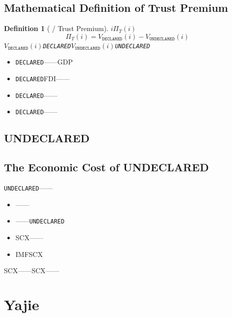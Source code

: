 \documentclass[12pt,a4paper]{article}
\newtheorem{definition}[theorem]{Definition}
\theoremstyle{remark}
\newcommand{\UNDECLARED}{\texttt{UNDECLARED}}
\newcommand{\DECLARED}{\texttt{DECLARED}}
\begin{document}
\subsection{}
\subsection{Mathematical Definition of Trust Premium}

\begin{definition}[ / Trust Premium]
    $i$$\Pi_T(i)$
    \begin{equation}
        \Pi_T(i) = V_{\DECLARED}(i) - V_{\UNDECLARED}(i)
    \end{equation}
    $V_{\DECLARED}(i)$\DECLARED{}$V_{\UNDECLARED}(i)$\UNDECLARED{}
\end{definition}



\begin{itemize}[nosep]
    \item \textbf{}\DECLARED{}——GDP
    \item \textbf{}\DECLARED{}FDI——
    \item \textbf{}\DECLARED{}——
    \item \textbf{}\DECLARED{}——
\end{itemize}

\subsection{UNDECLARED}
\subsection{The Economic Cost of UNDECLARED}

\UNDECLARED{}——

\begin{itemize}[nosep]
    \item ——
    \item ——\UNDECLARED{}
    \item SCX——
    \item IMFSCX
\end{itemize}

SCX——\textbf{}SCX——


\section{Yajie}
\end{document}
